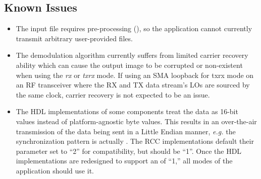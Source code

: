 \subsection{Known Issues}
\begin{itemize}
  \item
    The input file requires pre-processing (), so the application cannot currently transmit arbitrary user-provided files.
  \item  %
    The demodulation algorithm currently suffers from limited carrier recovery ability which can cause the output image to be corrupted or non-existent when using the \textit{rx} or \textit{txrx} mode.
    If using an SMA loopback for txrx mode on an RF transceiver where the RX and TX data stream's LOs are sourced by the same clock, carrier recovery is not expected to be an issue.
  \item  %
    The HDL implementations of some components treat the data as 16-bit values instead of platform-agnostic byte values.
    This results in an over-the-air transmission of the data being sent in a Little Endian manner, \textit{e.g.} the  synchronization pattern is actually .
    The RCC implementations default their  parameter set to ``2'' for compatibility, but should be ``1''.
    Once the HDL implementations are redesigned to support an  of ``1,'' all modes of the application should use it.
\end{itemize}
\newpage
